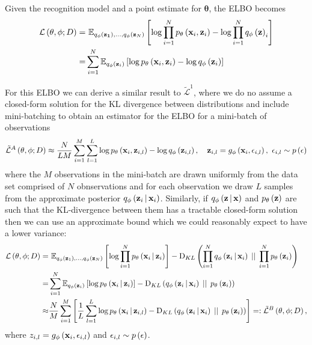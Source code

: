 \documentclass[../report.tex]{subfiles}
\begin{document}
Given the recognition model and a point estimate for $\mathbf{\theta}$, the ELBO becomes
\begin{align}
  \mathcal{L} \left( \mathbf{\theta}, \phi; D\right) =& \,\, \mathbb{E}_{q_\phi \left( \mathbf{z_1}\right),...,q_\phi \left( \mathbf{z}_N\right)} \left[ \log \prod_{i=1}^{N} p_\mathbf{\theta} \left( \mathbf{x}_i, \mathbf{z}_i\right) - \log \prod_{i=1}^{N} q_\phi \left( \mathbf{z}\right)_i \right] \nonumber \\
  =& \sum_{i=1}^{N} \mathbb{E}_{q_\phi \left( \mathbf{z}_i\right)} \left[ \log p_\mathbf{\theta} \left( \mathbf{x}_i, \mathbf{z}_i\right) - \log q_\phi \left( \mathbf{z}_i\right) \right] \nonumber \\
\end{align}

For this ELBO we can derive a similar result to $\tilde{\mathcal{L}}^1$, where we do no assume a closed-form solution for the KL divergence between distributions and include mini-batching to obtain an estimator for the ELBO for a mini-batch of observations
\begin{equation}
  \tilde{\mathcal{L}}^A \left( \mathbf{\theta}, \phi; D\right) \approx \frac{N}{LM} \sum_{i=1}^{M} \sum_{l=1}^{L} \log p_\mathbf{\theta} \left( \mathbf{x}_i, \mathbf{z}_{i,l}\right) - \log q_\phi \left( \mathbf{z}_{i,l}\right), \quad \mathbf{z}_{i,l} = g_\phi \left( \mathbf{x}_i, \mathbf{\epsilon}_{i,l}\right),\,\, \mathbf{\epsilon}_{i,l} \sim p \left( \mathbf{\epsilon}\right)
\end{equation}
where the $M$ observations in the mini-batch are drawn uniformly from the data set comprised of $N$ obnservations and for each observation we draw $L$ samples from the approximate posterior $q_\phi \left(\mathbf{z}_i \, \middle\vert \, \mathbf{x}_i \right)$.
Similarly, if $q_\phi \left(\mathbf{z} \, \middle\vert \, \mathbf{x} \right)$ and $p_\mathbf{\theta} \left( \mathbf{z}\right)$ are such that the KL-divergence between them has a tractable closed-form solution then we can use an approximate bound which we could reasonably expect to have a lower variance:
\begin{align}
  \mathcal{L} \left( \mathbf{\theta}, \phi; D\right) =& \,\,\mathbb{E}_{q_\phi \left( \mathbf{z}_1\right),...,q_\phi \left( \mathbf{z}_N\right)} \left[ \log \prod_{i=1}^{N} p_\mathbf{\theta} \left(\mathbf{x}_i \, \middle\vert \, \mathbf{z}_i \right) \right] - \textrm{D}_{KL} \left( \prod_{i=1}^{N} q_\phi \left(\mathbf{z}_i \, \middle\vert \, \mathbf{x}_i \right) \, \mid \mid \, \prod_{i=1}^{N} p_\mathbf{\theta} \left( \mathbf{z}_i\right)\right) \nonumber \\
  =& \sum_{i=1}^{N} \mathbb{E}_{q_\phi \left( \mathbf{z}_i\right)} \left[ \log p_\mathbf{\theta} \left(\mathbf{x}_i \, \middle\vert \, \mathbf{z}_i \right) \right] - \textrm{D}_{KL} \left( q_\phi \left(\mathbf{z}_i \, \middle\vert \, \mathbf{x}_i \right) \, \mid \mid \, p_\mathbf{\theta} \left( \mathbf{z}_i\right)\right) \nonumber \\
  \approx& \frac{N}{M} \sum_{i=1}^{M} \left[ \frac{1}{L} \sum_{l=1}^{L} \log p_\mathbf{\theta} \left(\mathbf{x}_i \, \middle\vert \, \mathbf{z}_{i,l} \right) - \textrm{D}_{KL} \left( q_{\phi} \left(\mathbf{z}_i \, \middle\vert \, \mathbf{x}_i \right) \, \mid \mid \, p_\mathbf{\theta} \left( \mathbf{z}_i\right)\right) \right] =: \tilde{\mathcal{L}}^B \left( \mathbf{\theta}, \phi; D\right), \label{eqn:Lb}
\end{align}
where $z_{i,l} = g_\phi \left( \mathbf{x}_i, \mathbf{\epsilon}_{i,l}\right)$ and $\mathbf{\epsilon}_{i,l} \sim p \left( \mathbf{\epsilon}\right)$.
\end{document}
